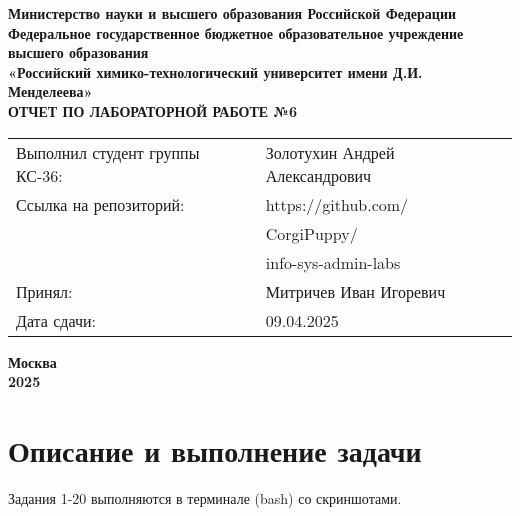 \documentclass[12pt, a4paper]{report}
\begin{document}
	\begin{titlepage}
			\begin{center}
				\large \textbf{Министерство науки и высшего образования Российской Федерации} \\
				\large \textbf{Федеральное государственное бюджетное образовательное учреждение высшего образования} \\
				\large \textbf{«Российский химико-технологический университет имени Д.И. Менделеева»} \\

				\vspace*{4cm}
				\LARGE \textbf{ОТЧЕТ ПО ЛАБОРАТОРНОЙ РАБОТЕ №6}

				\vspace*{4cm}
				\begin{flushright}
					\Large
					\begin{tabular}{>{\raggedleft\arraybackslash}p{8.85cm} p{10.8cm}}
						Выполнил студент группы КС-36: & Золотухин Андрей Александрович \\
						Ссылка на репозиторий: & https://github.com/ \\ 
						& CorgiPuppy/ \\
						& info-sys-admin-labs \\
						Принял: & Митричев Иван Игоревич \\
						Дата сдачи: & 09.04.2025 \\
					\end{tabular}

				\end{flushright}

				\vspace*{6cm}
				\Large \textbf{Москва \\ 2025}
			\end{center}
		\end{titlepage}
		
		\tableofcontents	
		\thispagestyle{empty}
		\newpage

		
		\section*{Описание и выполнение задачи}
		\large
		Задания 1-20 выполняются в терминале (bash) со скриншотами. \par
\end{document}
